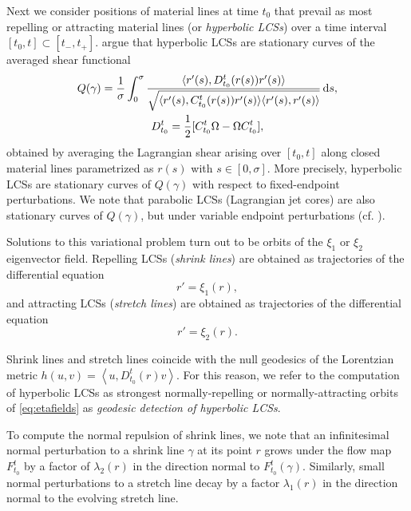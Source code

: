 \documentclass[5p]{elsarticle}
\begin{document}
Next we consider positions of material lines at time $t_0$ that prevail as most repelling or attracting material lines (or \emph{hyperbolic LCSs}) over a time interval $[t_0,t] \subset [t_-,t_+]$. \citet{farazmand14:_shearless} argue that hyperbolic LCSs are stationary curves of the averaged shear functional
\begin{gather*}
Q(\gamma) = \frac{1}{\sigma} \int_0^\sigma \frac{\langle r'(s),D_{t_0}^t(r(s)) r'(s)\rangle}{\sqrt{\langle r'(s),C_{t_0}^t(r(s)) r'(s)\rangle\langle r'(s),r'(s)\rangle}}\dif s,\\
D_{t_0}^t = \frac12 [C_{t_0}^t \Omega - \Omega C_{t_0}^t],
\end{gather*}
obtained by averaging the Lagrangian shear arising over $[t_0,t]$ along closed material lines parametrized as $r(s)$ with $s \in [0,\sigma]$. More precisely, hyperbolic LCSs are stationary curves of $Q(\gamma)$ with respect to fixed-endpoint perturbations. We note that parabolic LCSs (Lagrangian jet cores) are also stationary curves of $Q(\gamma)$, but under variable endpoint perturbations (cf. \citet{farazmand14:_shearless}).

Solutions to this variational problem turn out to be orbits of the $\xi_1$ or $\xi_2$ eigenvector field. Repelling LCSs (\emph{shrink lines}) are obtained as trajectories of the differential equation
\begin{equation}
r' = \xi_1(r),
\label{eq:shrink line}
\end{equation}
and attracting LCSs (\emph{stretch lines}) are obtained as trajectories of the differential equation
\begin{equation}
r' = \xi_2(r).
\label{eq:stretch line}
\end{equation}

Shrink lines and stretch lines coincide with the null geodesics of the Lorentzian metric $h(u,v) = \left\langle u,D_{t_0}^t(r) v \right\rangle$. For this reason, we refer to the computation of hyperbolic LCSs as strongest normally-repelling or normally-attracting orbits of \cref{eq:etafields} as \emph{geodesic detection of hyperbolic LCSs}.

To compute the normal repulsion of shrink lines, we note that an infinitesimal
normal perturbation to a shrink line $\gamma$ at its point $r$ grows under the flow map $F_{t_0}^t$ by a factor of $\lambda_2(r)$ in the direction normal to $F_{t_0}^t(\gamma)$.
Similarly, small normal perturbations to a stretch line decay by a factor $\lambda_1(r)$ in the direction normal to the evolving stretch line.
\end{document}
